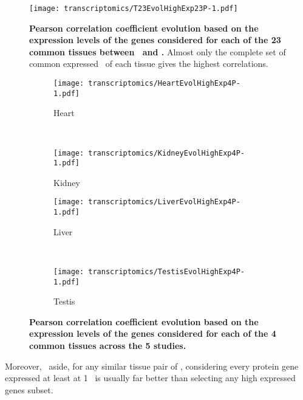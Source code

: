\begin{figure}[!htpb]
    \texttt{[image: transcriptomics/T23EvolHighExp23P-1.pdf]}\centering
    \caption[Pearson correlation coefficient evolution based on the expression
    levels of the genes considered for each of the 23 common tissues]{%
\label{fig:CorHighExp23T}\textbf{Pearson correlation coefficient evolution based
on the expression levels of the genes considered
for each of the 23 common tissues between \uhlen\ and \gtex.}
Almost only the complete set of common expressed \pcgs\ of each tissue gives
the highest correlations.}
\end{figure}

\begin{sidewaysfigure}[htpb]
    \centering
    \begin{subfigure}[b]{0.50\textwidth}\centering
        \texttt{[image: transcriptomics/HeartEvolHighExp4P-1.pdf]}
        \caption{Heart}\label{fig:CorHighExpHeart4T}
    \end{subfigure}%
~%
    \begin{subfigure}[b]{0.50\textwidth}\centering
        \texttt{[image: transcriptomics/KidneyEvolHighExp4P-1.pdf]}
        \caption{Kidney}\label{fig:CorHighExpKidney4T}
    \end{subfigure}

    \begin{subfigure}[b]{0.50\textwidth}\centering
        \texttt{[image: transcriptomics/LiverEvolHighExp4P-1.pdf]}
        \caption{Liver}\label{fig:CorHighExpLiver4T}
    \end{subfigure}%
~%
    \begin{subfigure}[b]{0.50\textwidth}\centering
        \texttt{[image: transcriptomics/TestisEvolHighExp4P-1.pdf]}
        \caption{Testis}\label{fig:CorHighExpTestis4T}
    \end{subfigure}
    \caption[Pearson correlation coefficient evolution based on the expression
    levels of the genes considered for each of the 4 common tissues]{%
\label{fig:CorHighExp4T}\textbf{Pearson correlation coefficient evolution
    based on the expression levels of the genes considered for each of the 4
    common tissues across the 5 studies.}}
\end{sidewaysfigure}

Moreover, \kidney\ aside,
for any similar tissue pair of \setTwo,
considering every protein gene expressed at least at 1 \FPKM\ is usually
far better than selecting any high expressed genes subset.

